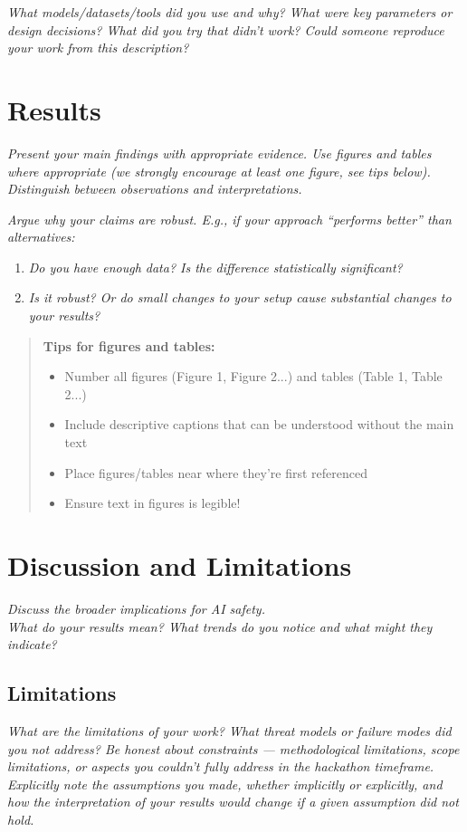 \documentclass[11pt,a4paper]{article}
\newcommand{\guidance}[1]{\textit{#1}}
\begin{document}
\guidance{What models/datasets/tools did you use and why? What were key parameters or design decisions? What did you try that didn't work? Could someone reproduce your work from this description?}

\section{Results}
\guidance{Present your main findings with appropriate evidence. Use figures and tables where appropriate (we strongly encourage at least one figure, see tips below). Distinguish between observations and interpretations.}

\guidance{Argue why your claims are robust. E.g., if your approach ``performs better'' than alternatives:}
\begin{enumerate}[label=(\alph*)]
\item \guidance{Do you have enough data? Is the difference statistically significant?}
\item \guidance{Is it robust? Or do small changes to your setup cause substantial changes to your results?}
\end{enumerate}

\begin{quote}
\textbf{Tips for figures and tables:}
\begin{itemize}[leftmargin=*]
\item Number all figures (Figure 1, Figure 2...) and tables (Table 1, Table 2...)
\item Include descriptive captions that can be understood without the main text
\item Place figures/tables near where they're first referenced
\item Ensure text in figures is legible!
\end{itemize}
\end{quote}

\section{Discussion and Limitations}
\guidance{Discuss the broader implications for AI safety.\\
What do your results mean? What trends do you notice and what might they indicate?}

\subsection*{Limitations}
\guidance{What are the limitations of your work? What threat models or failure modes did you not address? Be honest about constraints --- methodological limitations, scope limitations, or aspects you couldn't fully address in the hackathon timeframe. Explicitly note the assumptions you made, whether implicitly or explicitly, and how the interpretation of your results would change if a given assumption did not hold.}
\end{document}
